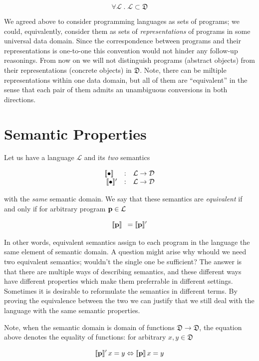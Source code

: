 \[
\forall \mathcal{L}\; .\; \mathcal{L}\subset\mathfrak{D}
\]

We agreed above to consider programming languages as sets of programs; we could, equivalently, consider them as sets of \emph{representations} of
programs in some universal data domain. Since the correspondence between programs and their representations is one-to-one this convention would
not hinder any follow-up reasonings. From now on we will not distinguish programs (abstract objects) from their representations (concrete objects)
in $\mathfrak{D}$. Note, there can be miltiple representations within one data domain, but all of them are ``equivalent'' in the sense that
each pair of them admits an unambiguous conversions in both directions.

\section{Semantic Properties}

Let us have a language $\mathcal{L}$ and its \emph{two} semantics

\[
\begin{array}{rcl}
    \sembr{\bullet}^\ph & : & \mathcal{L} \to \mathcal{D}\\
  \sembr{\bullet}^\prime & : & \mathcal{L} \to \mathcal{D}
\end{array}
\]

with the \emph{same} semantic domain. We say that these semantics are \emph{equivalent} if and only if for arbitrary program $\mathbf{p}\in\mathcal{L}$

\[
\sembr{\primi{p}}^\ph=\sembr{\primi{p}}^\prime
\]

In other words, equivalent semantics assign to each program in the language the same element of semantic domain. A question might arise why whould we
need two equivalent semantics; wouldn't the single one be sufficient? The answer is that there are multiple ways of
describing semantics, and these different ways have different properties which make them preferrable in different settings. Sometimes it is desirable to
reformulate the semantics in different terms. By proving the equivalence between the two we can justify that we still deal with the language with the same
semantic properties.

Note, when the semantic domain is domain of functions $\mathfrak{D}\to\mathfrak{D}$, the equation above denotes the equality of functions: for
arbitrary $x, y\in\mathfrak{D}$

\[
\llbracket{\mathbf{p}}\rrbracket^\prime\,x=y \Leftrightarrow \llbracket{\mathbf{p}}\rrbracket\,x=y
\]

